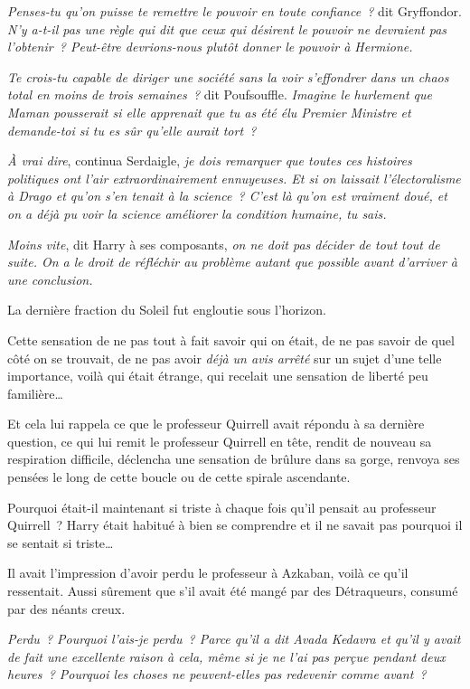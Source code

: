 \emph{Penses-tu qu'on puisse te remettre le pouvoir en toute confiance~?} dit Gryffondor. \emph{N'y a-t-il pas une règle qui dit que ceux qui désirent le pouvoir ne devraient pas l'obtenir~? Peut-être devrions-nous plutôt donner le pouvoir à Hermione.}

\emph{Te crois-tu capable de diriger une société sans la voir s'effondrer dans un chaos total en moins de trois semaines~?} dit Poufsouffle. \emph{Imagine le hurlement que Maman pousserait si elle apprenait que tu as été élu Premier Ministre et demande-toi si tu es sûr qu'elle aurait tort~?}

\emph{À vrai dire}, continua Serdaigle, \emph{je dois remarquer que toutes ces histoires politiques ont l'air extraordinairement ennuyeuses. Et si on laissait l'électoralisme à Drago et qu'on s'en tenait à la science~? C'est là qu'on est vraiment doué, et on a déjà pu voir la science améliorer la condition humaine, tu sais.}

\emph{Moins vite}, dit Harry à ses composants, \emph{on ne doit pas décider de tout tout de suite. On a le droit de réfléchir au problème autant que possible avant d'arriver à une conclusion.}

La dernière fraction du Soleil fut engloutie sous l'horizon.

Cette sensation de ne pas tout à fait savoir qui on était, de ne pas savoir de quel côté on se trouvait, de ne pas avoir \emph{déjà un avis arrêté} sur un sujet d'une telle importance, voilà qui était étrange, qui recelait une sensation de liberté peu familière…

Et cela lui rappela ce que le professeur Quirrell avait répondu à sa dernière question, ce qui lui remit le professeur Quirrell en tête, rendit de nouveau sa respiration difficile, déclencha une sensation de brûlure dans sa gorge, renvoya ses pensées le long de cette boucle ou de cette spirale ascendante.

Pourquoi était-il maintenant si triste à chaque fois qu'il pensait au professeur Quirrell~? Harry était habitué à bien se comprendre et il ne savait pas pourquoi il se sentait si triste…

Il avait l'impression d'avoir perdu le professeur à Azkaban, voilà ce qu'il ressentait. Aussi sûrement que s'il avait été mangé par des Détraqueurs, consumé par des néants creux.

\emph{Perdu~? Pourquoi l'ais-je perdu~? Parce qu'il a dit Avada Kedavra et qu'il y avait de fait une excellente raison à cela, même si je ne l'ai pas perçue pendant deux heures~? Pourquoi les choses ne peuvent-elles pas redevenir comme avant~?}

